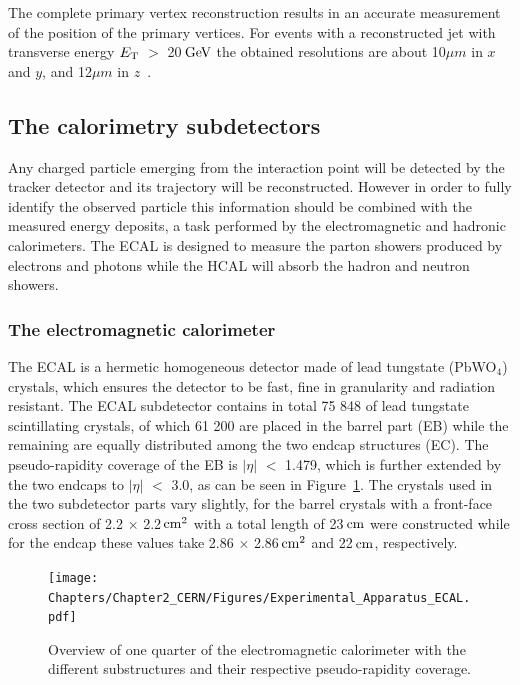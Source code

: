 The complete primary vertex reconstruction results in an accurate measurement of the position of the primary vertices. For events with a reconstructed jet with transverse energy $E_{\rm T}$ $>$ 20$\, \mathrm{GeV}$ the obtained resolutions are about 10$\unit{\mu m}$ in $x$ and $y$, and 12$\unit{\mu m}$ in $z$~\cite{TrackAndPVReco}. 

\subsection{The calorimetry subdetectors}\label{sec::CAL}
Any charged particle emerging from the interaction point will be detected by the tracker detector and its trajectory will be reconstructed. However in order to fully identify the observed particle this information should be combined with the measured energy deposits, a task performed by the electromagnetic and hadronic calorimeters. The ECAL is designed to measure the parton showers produced by electrons and photons while the HCAL will absorb the hadron and neutron showers.

\subsubsection{The electromagnetic calorimeter}
The ECAL is a hermetic homogeneous detector made of lead tungstate (PbWO$_{4}$) crystals, which ensures the detector to be fast, fine in granularity and radiation resistant. 
The ECAL subdetector contains in total 75 848 of lead tungstate scintillating crystals, of which 
61 200 are placed in the barrel part (EB) while the remaining are equally distributed among the two endcap structures (EC). %
The pseudo-rapidity coverage of the EB is $\vert \eta \vert$ $<$ 1.479, which is further extended by the two endcaps to $\vert \eta \vert$ $<$ 3.0, as can be seen in Figure~\ref{fig::ECAL}. The crystals used in the two subdetector parts vary slightly, for the barrel crystals with a front-face cross section of 2.2 $\times$ 2.2$\, \mathrm{cm}^{2}$ with a total length of 23$\, \mathrm{cm}$ were constructed while for the endcap these values take 2.86 $\times$ 2.86$\, \mathrm{cm}^{2}$ and 22$\, \mathrm{cm}$, respectively.
\begin{figure}[h!t]
 \centering
 \texttt{[image: Chapters/Chapter2\_CERN/Figures/Experimental\_Apparatus\_ECAL.pdf]}
 \caption{Overview of one quarter of the electromagnetic calorimeter with the different substructures and their respective pseudo-rapidity coverage.} \label{fig::ECAL}
\end{figure}


